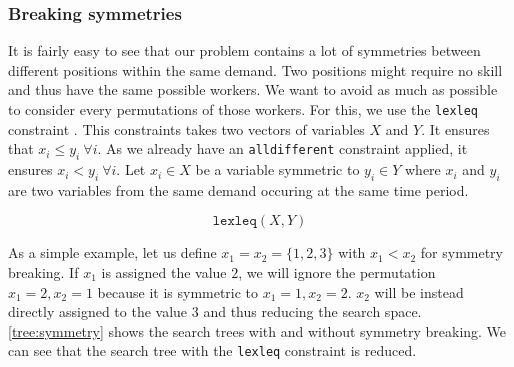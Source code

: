 \documentclass[../../thesis.tex]{subfiles}
\begin{document}
\subsubsection{Breaking symmetries}

It is fairly easy to see that our problem contains a lot of symmetries between different positions within the same demand. 
Two positions might require no skill and thus have the same possible workers. We want to avoid as much as possible to consider every permutations of those workers.
For this, we use the \texttt{lexleq} constraint \cite{Alan:Lex}. This constraints takes two vectors of variables $X$ and $Y$. It ensures that 
$x_i \leq y_i \ \forall i$. As we already have an \texttt{alldifferent} constraint applied, it ensures $x_i < y_i \ \forall i$.
Let $x_i \in X$ be a variable symmetric to $y_i \in Y$ where $x_i$ and $y_i$ are two variables from the same demand occuring at the same time period.


\begin{equation}
  \texttt{lexleq}(X, Y)
\end{equation}

As a simple example, let us define $x_1 = x_2 = \{ 1, 2, 3 \}$ with $x_1 < x_2$ for symmetry breaking. If 
$x_1$ is assigned the value $2$, we will ignore the permutation $x_1 = 2, x_2 = 1$ because it is symmetric to $x_1 = 1, x_2 = 2$. $x_2$ will be instead directly assigned to the value $3$ and thus reducing the search space.
\autoref{tree:symmetry} shows the search trees with and without symmetry breaking. We can see that the search tree with the \texttt{lexleq} constraint is reduced.

\end{document}
